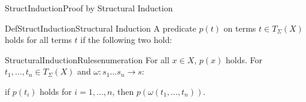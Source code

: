 
\begin{Paragraph}{StructInduction}{Proof by Structural Induction}{}
\begin{Definition}{DefStructInduction}{Structural Induction}{}
A predicate $p(t)$ on terms $t\in T_{\Sigma}(X)$ holds for all terms
$t$ if the following two hold:

\begin{List}{StructuralInductionRules}{enumeration}{}
  \ListItem{}
  For all $x\in X$, $p(x)$ holds. 
  \ListItem{}
  For $t_1,\ldots,t_n\in T_\Sigma(X)$ and $\omega:s_1\ldots
  s_n\rightarrow s$: 

  if $p(t_i)$ holds for $i=1,\ldots,n$, then
  $p(\omega(t_1,\ldots,t_n))$. 
\end{List}
\end{Definition}
\end{Paragraph}
